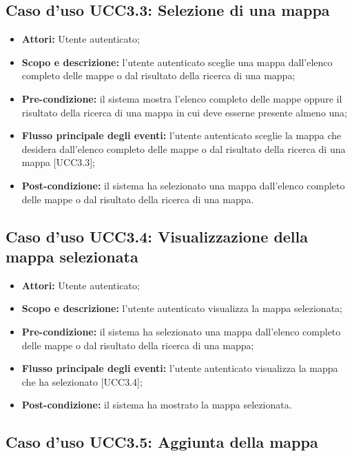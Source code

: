 \subsection{Caso d'uso UCC3.3: Selezione di una mappa}
\begin{itemize}
\item \textbf{Attori:} Utente autenticato;
\item \textbf{Scopo e descrizione:} l'utente autenticato sceglie una mappa dall'elenco completo delle mappe o dal risultato della ricerca di una mappa;
\item \textbf{Pre-condizione:} il sistema mostra l'elenco completo delle mappe oppure il risultato della ricerca di una mappa in cui deve esserne presente almeno una;
\item \textbf{Flusso principale degli eventi:} l'utente autenticato sceglie la mappa che desidera dall'elenco completo delle mappe o dal risultato della ricerca di una mappa [UCC3.3];
\item \textbf{Post-condizione:} il sistema ha selezionato una mappa dall'elenco completo delle mappe o dal risultato della ricerca di una mappa.
\end{itemize}

\subsection{Caso d'uso UCC3.4: Visualizzazione della mappa selezionata}
\begin{itemize}
\item \textbf{Attori:} Utente autenticato;
\item \textbf{Scopo e descrizione:} l'utente autenticato visualizza la mappa selezionata;
\item \textbf{Pre-condizione:} il sistema ha selezionato una mappa dall'elenco completo delle mappe o dal risultato della ricerca di una mappa;
\item \textbf{Flusso principale degli eventi:} l'utente autenticato visualizza la mappa che ha selezionato [UCC3.4];
\item \textbf{Post-condizione:} il sistema ha mostrato la mappa selezionata.
\end{itemize}

\subsection{Caso d'uso UCC3.5: Aggiunta della mappa}

